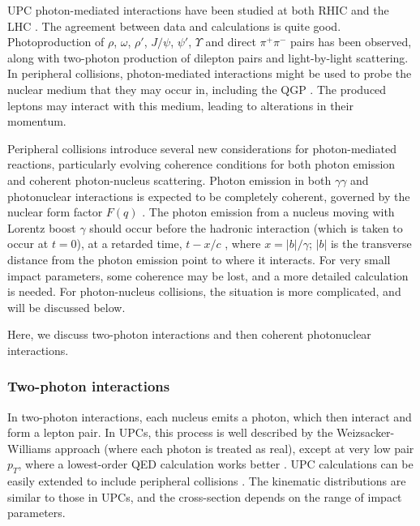 \documentclass[../report.tex]{subfiles}
\begin{document}
UPC photon-mediated interactions have been studied at both RHIC and the LHC \cite{Baltz:2007kq,Bertulani:2005ru,Klein:2017nqo,Bertulani:1987tz,Baur:2001jj}.  The agreement between data and calculations is quite good.  Photoproduction of $\rho$, $\omega$, $\rho'$, $J/\psi$, $\psi'$,  $\Upsilon$ and direct $\pi^+\pi^-$ pairs has been observed, along with two-photon production of dilepton pairs and light-by-light scattering.  In peripheral collisions, photon-mediated interactions might be used to probe the nuclear medium that they may occur in, including the QGP \cite{QM2018:presentation:AaronAngerami,Adam:2018tdm}.   The produced leptons may interact with this medium, leading to alterations in their momentum.    

Peripheral collisions introduce several new considerations for  photon-mediated reactions, particularly evolving coherence conditions for both photon emission and coherent photon-nucleus scattering.  Photon emission in both $\gamma\gamma$ and photonuclear interactions is expected to be completely coherent, governed by the nuclear form factor $F(q)$ \cite{Vidovic:1992ik}.   The photon emission from a nucleus moving with Lorentz boost $\gamma$ should occur before the hadronic interaction (which is taken to occur at $t=0$), at a retarded time, $t-x/c$ \cite{Zha:2017jch}, where $x=|b|/\gamma$; $|b|$ is the transverse distance from the photon emission point to where it interacts.    For very small impact parameters, some coherence may be lost, and a more detailed calculation is needed.  For photon-nucleus collisions, the situation is more complicated, and will be discussed below. 

Here, we discuss two-photon interactions and then coherent photonuclear interactions. 

\subsubsection{Two-photon interactions}

In two-photon interactions, each nucleus emits a photon, which then interact and form a lepton pair.   In UPCs, this process is well described by the Weizsacker-Williams approach (where each photon is treated as real), except at very low pair $p_T$, where a lowest-order QED calculation works better \cite{Adams:2004rz}.     UPC calculations can be easily extended to include peripheral collisions \cite{Klein:2018cjh, Zha:2018ywo,Klusek-Gawenda:2018zfz}.  The kinematic distributions are similar to those in UPCs, and the cross-section depends on the range of impact parameters.
\end{document}
